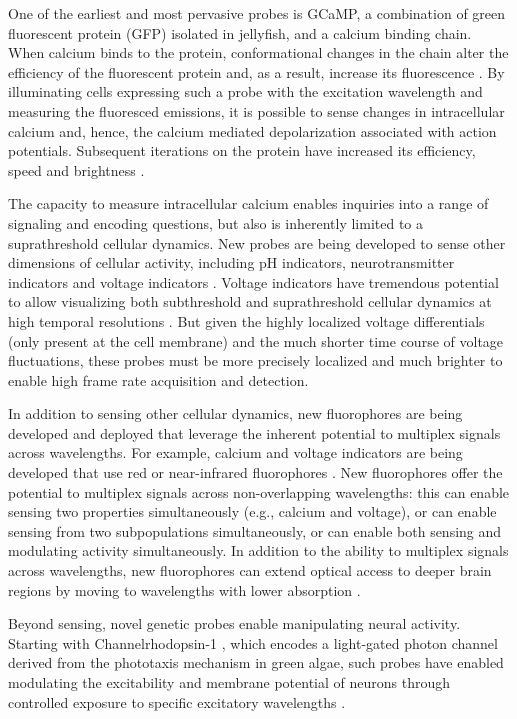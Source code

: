 One of the earliest and most pervasive probes is GCaMP, a
combination of green fluorescent protein (GFP) isolated in 
jellyfish, and a calcium binding chain. When calcium 
binds to the protein, conformational changes in the chain 
alter the efficiency of the fluorescent protein and, 
as a result, increase its fluorescence
\cite{Nakai:2001fy,Barnett:2017kn}. By illuminating cells expressing such a
probe with the excitation wavelength and measuring the 
fluoresced emissions, it is possible to sense changes in
intracellular calcium and, hence, the calcium mediated 
depolarization associated with action potentials. Subsequent 
iterations on the protein have increased its efficiency, 
speed and brightness \cite{Chen:2013fc}.

The capacity to measure intracellular calcium enables 
inquiries into a range of signaling and encoding questions, 
but also is inherently limited to a suprathreshold cellular 
dynamics. New probes are being developed to sense other 
dimensions of cellular activity, including pH indicators, 
neurotransmitter indicators and voltage indicators 
\cite{Lin:2016id}. Voltage indicators have tremendous 
potential to allow visualizing both subthreshold and 
suprathreshold cellular dynamics at high temporal resolutions 
\cite{Han:2013iz,StPierre:2014db,Gong:2015is}. But given 
the highly localized voltage differentials (only present 
at the cell membrane) and the much shorter time course of 
voltage fluctuations, these probes must be more precisely
localized and much brighter to enable high frame rate 
acquisition and detection.

In addition to sensing other cellular dynamics, new fluorophores  
are being developed and deployed that leverage the inherent 
potential to multiplex signals across wavelengths. For example,
calcium and voltage indicators are being developed that use 
red or near-infrared fluorophores 
\cite{Tischbirek:2015fi,Dana:2016hx}. New fluorophores offer 
the potential to multiplex signals across non-overlapping 
wavelengths: this can enable sensing two properties 
simultaneously (e.g., calcium and voltage), or can enable sensing
from two subpopulations simultaneously, or can enable both 
sensing and modulating activity simultaneously. In addition to 
the ability to multiplex signals across wavelengths, new 
fluorophores can extend optical access to deeper brain regions by 
moving to wavelengths with lower absorption 
\cite{Tischbirek:2015fi,Dana:2016hx}.

Beyond sensing, novel genetic probes enable manipulating 
neural activity. Starting with Channelrhodopsin-1 
\cite{Nagel:2002cw}, which encodes a light-gated photon 
channel derived from the phototaxis mechanism in green 
algae, such probes have enabled modulating the excitability 
and membrane potential of neurons through controlled 
exposure to specific excitatory wavelengths 
\cite{Boyden:2005cd,Deisseroth:2006dd,Yizhar:2011jv}.


